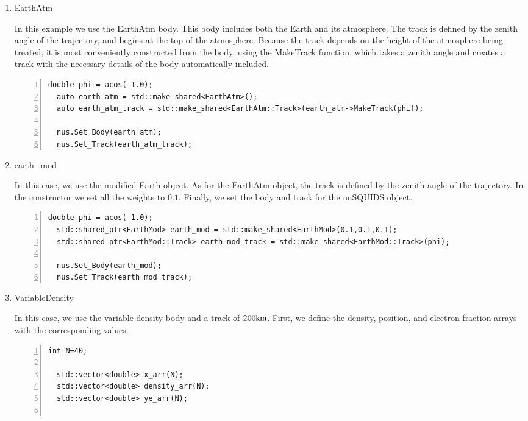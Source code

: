 \documentclass[3p,12pt]{elsarticle}
\newcommand{\ttf}{\ttfamily}
\begin{document}
\begin{enumerate}
\item {\ttf EarthAtm}

In this example we use the {\ttf EarthAtm} body. 
This body includes both the Earth and its atmosphere. 
The track is defined by the zenith angle of the trajectory, and begins at the top of the atmosphere. 
Because the track depends on the height of the atmosphere being treated, it is most conveniently constructed from the body, using the {\ttf MakeTrack} function, which takes a zenith angle and creates a track with the necessary details of the body automatically included. 
\begin{lstlisting}[frame=leftline, numbers =
  left,breaklines=true,label = ex:sin1,firstnumber=last]
  double phi = acos(-1.0);
  auto earth_atm = std::make_shared<EarthAtm>();
  auto earth_atm_track = std::make_shared<EarthAtm::Track>(earth_atm->MakeTrack(phi));

  nus.Set_Body(earth_atm);
  nus.Set_Track(earth_atm_track);
\end{lstlisting}

\item {\ttf earth\_mod}

  In this case, we use the modified Earth object.
  As for the {\ttf EarthAtm} object, the track is defined by the zenith angle of
  the trajectory. In the constructor we set all the weights to $0.1$.
  Finally, we set the body and track for the {\ttf nuSQUIDS} object.
  
\begin{lstlisting}[frame=leftline, numbers =
  left,breaklines=true,label = ex:sin1,firstnumber=last]
  double phi = acos(-1.0);
  std::shared_ptr<EarthMod> earth_mod = std::make_shared<EarthMod>(0.1,0.1,0.1);
  std::shared_ptr<EarthMod::Track> earth_mod_track = std::make_shared<EarthMod::Track>(phi);  

  nus.Set_Body(earth_mod);
  nus.Set_Track(earth_mod_track);
\end{lstlisting}


\item {\ttf VariableDensity}

In this case, we use the variable density body and a track of $200{\rm km}$.
First, we define the density, position, and electron fraction arrays
with the corresponding values.
\begin{lstlisting}[frame=leftline, numbers =
  left,breaklines=true,label = ex:sin1,firstnumber=last]
  int N=40;

  std::vector<double> x_arr(N);
  std::vector<double> density_arr(N);
  std::vector<double> ye_arr(N);


\end{lstlisting}
\end{enumerate}
\end{document}
